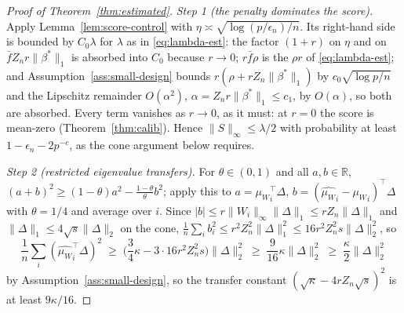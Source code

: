 \documentclass[12pt,a4paper]{article}
\theoremstyle{definition}
\theoremstyle{remark}
\newcommand{\R}{\mathbb{R}}
\newcommand{\betas}{\beta^*}
\newcommand{\muv}{\mu_W}
\begin{document}
\begin{proof}[Proof of Theorem~\ref{thm:estimated}]
\emph{Step 1 (the penalty dominates the score).}
Apply Lemma~\ref{lem:score-control} with
$\eta\asymp\sqrt{\log(p/\epsilon_n)/n}$. Its
right-hand side is bounded by $C_0\lambda$ for $\lambda$ as in \eqref{eq:lambda-est}: the
factor $(1+r)$ on $\eta$ and on $\bar fZ_nr\|\betas\|_1$ is absorbed into $C_0$ because
$r\to0$; $r\bar f\rho$ is the $\rho r$ of \eqref{eq:lambda-est}; and
Assumption~\ref{ass:small-design} bounds $r(\rho+rZ_n\|\betas\|_1)$ by
$c_0\sqrt{\log p/n}$ and the Lipschitz remainder $O(\alpha^2)$,
$\alpha=Z_nr\|\betas\|_1\le c_1$, by $O(\alpha)$, so both are absorbed.
Every term vanishes as $r\to0$, as it must: at $r=0$ the score is mean-zero
(Theorem~\ref{thm:calib}). Hence $\|S\|_\infty\le\lambda/2$ with probability at
least $1-\epsilon_n-2p^{-c}$, as the cone argument below requires.

\emph{Step 2 (restricted eigenvalue transfers).} For $\theta\in(0,1)$ and all
$a,b\in\R$, $(a+b)^2\ge(1-\theta)a^2-\frac{1-\theta}{\theta}b^2$; apply this to
$a={\muv}_i^\top\Delta$, $b=({\hat{\muv}}_i-{\muv}_i)^\top\Delta$ with $\theta=1/4$ and
average over $i$. Since $|b|\le r\|W_i\|_\infty\|\Delta\|_1\le rZ_n\|\Delta\|_1$ and
$\|\Delta\|_1\le4\sqrt s\|\Delta\|_2$ on the cone,
$\frac1n\sum_i b_i^2\le r^2Z_n^2\|\Delta\|_1^2\le16r^2Z_n^2s\|\Delta\|_2^2$, so
\begin{equation*}
\frac1n\sum_i({\hat{\muv}}_i^\top\Delta)^2
\;\ge\;\Big(\frac34\kappa-3\cdot16r^2Z_n^2s\Big)\|\Delta\|_2^2
\;\ge\;\frac{9}{16}\kappa\|\Delta\|_2^2
\;\ge\;\frac\kappa2\|\Delta\|_2^2
\end{equation*}
by Assumption~\ref{ass:small-design}, so the transfer constant
$(\sqrt\kappa-4rZ_n\sqrt s)^2$ is at least $9\kappa/16$.


\end{proof}
\end{document}
